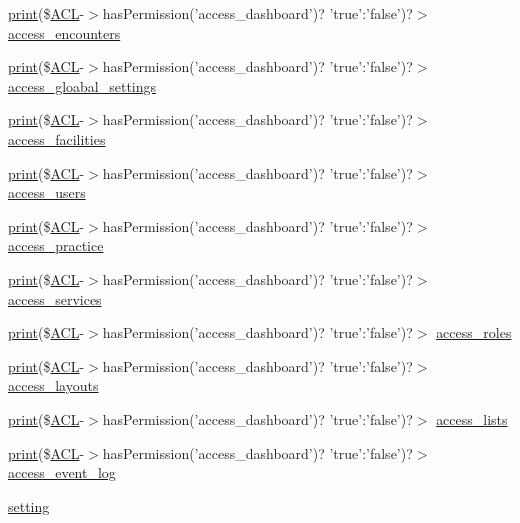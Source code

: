 \begin{DoxyCompactItemize}
\hyperlink{tokenizer__test_8php_a3ad3a4240c0f97c7e85aff5c52a454d4}{print}(\$\hyperlink{class_a_c_l}{\-A\-C\-L}-\/$>$has\-Permission('access\-\_\-dashboard')? \*
'true'\-:'false')?$>$ \hyperlink{registry_8js_8php_a7398f6e50dbebbc4384d14ed6aaaf931}{access\-\_\-encounters}
\item 
\hyperlink{tokenizer__test_8php_a3ad3a4240c0f97c7e85aff5c52a454d4}{print}(\$\hyperlink{class_a_c_l}{\-A\-C\-L}-\/$>$has\-Permission('access\-\_\-dashboard')? \*
'true'\-:'false')?$>$ \hyperlink{registry_8js_8php_a438a1a7699013712e3a29a728b0a82eb}{access\-\_\-gloabal\-\_\-settings}
\item 
\hyperlink{tokenizer__test_8php_a3ad3a4240c0f97c7e85aff5c52a454d4}{print}(\$\hyperlink{class_a_c_l}{\-A\-C\-L}-\/$>$has\-Permission('access\-\_\-dashboard')? \*
'true'\-:'false')?$>$ \hyperlink{registry_8js_8php_a7279a20e84eea9f84718fd111d53a908}{access\-\_\-facilities}
\item 
\hyperlink{tokenizer__test_8php_a3ad3a4240c0f97c7e85aff5c52a454d4}{print}(\$\hyperlink{class_a_c_l}{\-A\-C\-L}-\/$>$has\-Permission('access\-\_\-dashboard')? \*
'true'\-:'false')?$>$ \hyperlink{registry_8js_8php_a733ed137e272d2c496cd21d34f26fd97}{access\-\_\-users}
\item 
\hyperlink{tokenizer__test_8php_a3ad3a4240c0f97c7e85aff5c52a454d4}{print}(\$\hyperlink{class_a_c_l}{\-A\-C\-L}-\/$>$has\-Permission('access\-\_\-dashboard')? \*
'true'\-:'false')?$>$ \hyperlink{registry_8js_8php_a8f444653c7c6d0819aac674bfde2c328}{access\-\_\-practice}
\item 
\hyperlink{tokenizer__test_8php_a3ad3a4240c0f97c7e85aff5c52a454d4}{print}(\$\hyperlink{class_a_c_l}{\-A\-C\-L}-\/$>$has\-Permission('access\-\_\-dashboard')? \*
'true'\-:'false')?$>$ \hyperlink{registry_8js_8php_a5a0b766315a4c99310a4a0e8c4a7128c}{access\-\_\-services}
\item 
\hyperlink{tokenizer__test_8php_a3ad3a4240c0f97c7e85aff5c52a454d4}{print}(\$\hyperlink{class_a_c_l}{\-A\-C\-L}-\/$>$has\-Permission('access\-\_\-dashboard')? \*
'true'\-:'false')?$>$ \hyperlink{registry_8js_8php_ab35433fee89acf4720f088bfb8012874}{access\-\_\-roles}
\item 
\hyperlink{tokenizer__test_8php_a3ad3a4240c0f97c7e85aff5c52a454d4}{print}(\$\hyperlink{class_a_c_l}{\-A\-C\-L}-\/$>$has\-Permission('access\-\_\-dashboard')? \*
'true'\-:'false')?$>$ \hyperlink{registry_8js_8php_a8c86f117a2b2228a85bac0f8808b135d}{access\-\_\-layouts}
\item 
\hyperlink{tokenizer__test_8php_a3ad3a4240c0f97c7e85aff5c52a454d4}{print}(\$\hyperlink{class_a_c_l}{\-A\-C\-L}-\/$>$has\-Permission('access\-\_\-dashboard')? \*
'true'\-:'false')?$>$ \hyperlink{registry_8js_8php_a67c79d708f95250a42430f4155ff9169}{access\-\_\-lists}
\item 
\hyperlink{tokenizer__test_8php_a3ad3a4240c0f97c7e85aff5c52a454d4}{print}(\$\hyperlink{class_a_c_l}{\-A\-C\-L}-\/$>$has\-Permission('access\-\_\-dashboard')? \*
'true'\-:'false')?$>$ \hyperlink{registry_8js_8php_ad23557ad0f582dcefd35ea7bf873175c}{access\-\_\-event\-\_\-log}
\item 
\hyperlink{registry_8js_8php_a4b6ad35871b2d44923f2a793f11029b0}{setting}
\end{DoxyCompactItemize}


